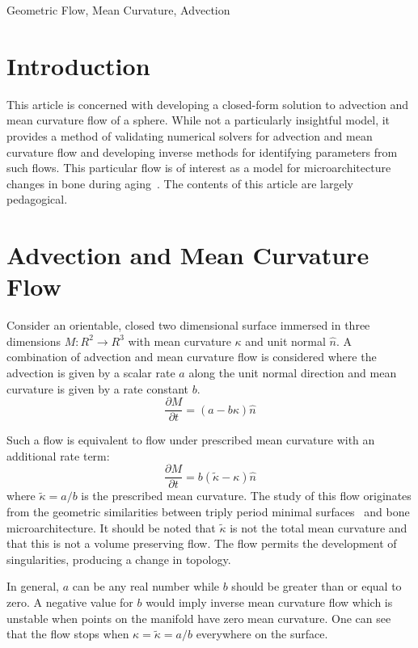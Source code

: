 \documentclass[journal]{IEEEtran}
\begin{document}
\begin{IEEEkeywords}
Geometric Flow, Mean Curvature, Advection
\end{IEEEkeywords}

\section{Introduction}
This article is concerned with developing a closed-form solution to advection and mean curvature flow of a sphere.
While not a particularly insightful model, it provides a method of validating numerical solvers for advection and mean curvature flow and developing inverse methods for identifying parameters from such flows.
This particular flow is of interest as a model for microarchitecture changes in bone  during aging~\cite{besler2018bone}.
The contents of this article are largely pedagogical.

\section{Advection and Mean Curvature Flow}
Consider an orientable, closed two dimensional surface immersed in three dimensions $M \colon \!R^2 \rightarrow \!R^3$ with mean curvature $\kappa$ and unit normal $\hat{n}$.
A combination of advection and mean curvature flow is considered where the advection is given by a scalar rate $a$ along the unit normal direction and mean curvature is given by a rate constant $b$.
\begin{equation}
  \label{eqn:advection-mean}
  \frac{\partial M}{\partial t} = (a - b \kappa) \hat{n}
\end{equation}

Such a flow is equivalent to flow under prescribed mean curvature with an additional rate term:
\begin{equation}
  \frac{\partial M}{\partial t} = b(\tilde{\kappa} - \kappa) \hat{n}
\end{equation}
where $\tilde{\kappa} = a/b$ is the prescribed mean curvature.
The study of this flow originates from the geometric similarities between triply period minimal surfaces~\cite{schoen1970infinite,anderson1987periodic,chopp1993flow} and bone microarchitecture.
It should be noted that $\tilde{\kappa}$ is not the total mean curvature and that this is not a volume preserving flow.
The flow permits the development of singularities, producing a change in topology.

In general, $a$ can be any real number while $b$ should be greater than or equal to zero.
A negative value for $b$ would imply inverse mean curvature flow which is unstable when points on the manifold have zero mean curvature.
One can see that the flow stops when $\kappa = \tilde{\kappa} = a/b$ everywhere on the surface.
\end{document}
